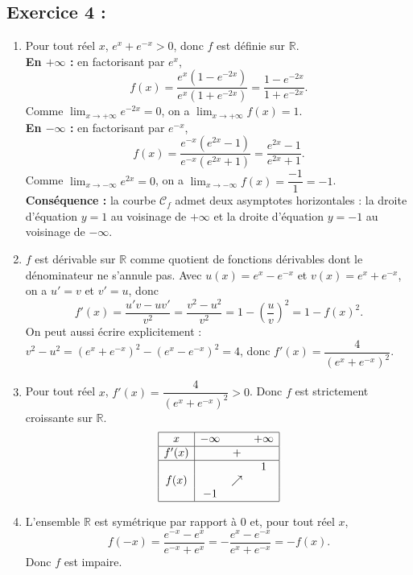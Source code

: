 \documentclass[12pt,a4paper]{article}
\begin{document}
\subsection*{Exercice 4 :}
\begin{enumerate}
\item Pour tout réel $x$, $e^x+e^{-x}>0$, donc $f$ est définie sur $\mathbb{R}$.\\
\textbf{En $+\infty$ :} en factorisant par $e^x$,
$$f(x)=\dfrac{e^x\left(1-e^{-2x}\right)}{e^x\left(1+e^{-2x}\right)}=\dfrac{1-e^{-2x}}{1+e^{-2x}}.$$
Comme $\displaystyle\lim_{x\to+\infty}e^{-2x}=0$, on a $\displaystyle\lim_{x\to+\infty}f(x)=1$.\\
\textbf{En $-\infty$ :} en factorisant par $e^{-x}$,
$$f(x)=\dfrac{e^{-x}\left(e^{2x}-1\right)}{e^{-x}\left(e^{2x}+1\right)}=\dfrac{e^{2x}-1}{e^{2x}+1}.$$
Comme $\displaystyle\lim_{x\to-\infty}e^{2x}=0$, on a $\displaystyle\lim_{x\to-\infty}f(x)=\dfrac{-1}{1}=-1$.\\
\textbf{Conséquence :} la courbe $\mathscr{C}_f$ admet deux asymptotes horizontales : la droite d'équation $y=1$ au voisinage de $+\infty$ et la droite d'équation $y=-1$ au voisinage de $-\infty$.

\item $f$ est dérivable sur $\mathbb{R}$ comme quotient de fonctions dérivables dont le dénominateur ne s'annule pas. Avec $u(x)=e^x-e^{-x}$ et $v(x)=e^x+e^{-x}$, on a $u'=v$ et $v'=u$, donc
$$f'(x)=\dfrac{u'v-uv'}{v^2}=\dfrac{v^2-u^2}{v^2}=1-\left(\dfrac{u}{v}\right)^2=1-f(x)^2.$$
On peut aussi écrire explicitement : $v^2-u^2=(e^x+e^{-x})^2-(e^x-e^{-x})^2=4$, donc $f'(x)=\dfrac{4}{\left(e^x+e^{-x}\right)^2}$.

\item Pour tout réel $x$, $f'(x)=\dfrac{4}{\left(e^x+e^{-x}\right)^2}>0$. Donc $f$ est strictement croissante sur $\mathbb{R}$.
$$\begin{array}{|c|ccc|}
\hline
x & -\infty & & +\infty\\
\hline
f'(x) & & + & \\
\hline
 & & & 1\\
f(x) & & \nearrow & \\
 & -1 & & \\
\hline
\end{array}$$

\item L'ensemble $\mathbb{R}$ est symétrique par rapport à $0$ et, pour tout réel $x$,
$$f(-x)=\dfrac{e^{-x}-e^{x}}{e^{-x}+e^{x}}=-\dfrac{e^x-e^{-x}}{e^x+e^{-x}}=-f(x).$$
Donc $f$ est impaire.
\end{enumerate}
\end{document}
